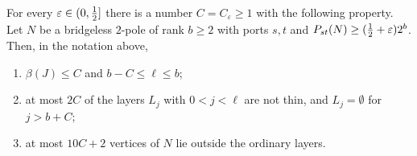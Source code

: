 \begin{proposition}\label{prop:thin}
For every $\varepsilon\in(0,\tfrac12]$ there is a number $C=C_\varepsilon\ge1$ with the following
property. Let $N$ be a bridgeless $2$-pole of rank $b\ge2$ with ports $s,t$ and
$P_{st}(N)\ge(\tfrac12+\varepsilon)2^{b}$. Then, in the notation above,
\begin{enumerate}
\item[\textup{(i)}] $\beta(J)\le C$ and $b-C\le\ell\le b$;
\item[\textup{(ii)}] at most $2C$ of the layers $L_j$ with $0<j<\ell$ are not thin, and
$L_j=\emptyset$ for $j>b+C$;
\item[\textup{(iii)}] at most $10C+2$ vertices of $N$ lie outside the ordinary layers.
\end{enumerate}
\end{proposition}

